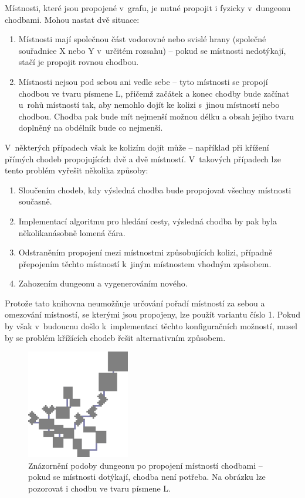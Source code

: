 Místnosti, které jsou propojené v~grafu, je nutné propojit i fyzicky v~dungeonu chodbami.
Mohou nastat dvě situace:
\begin{enumerate}
    \item Místnosti mají společnou část vodorovné nebo svislé hrany (společné souřadnice X nebo Y v~určitém rozsahu) -- pokud se místnosti nedotýkají, stačí je propojit rovnou chodbou.
    \item Místnosti nejsou pod sebou ani vedle sebe -- tyto místnosti se propojí chodbou ve tvaru písmene L, přičemž začátek a konec chodby bude začínat u~rohů místností tak, aby nemohlo dojít ke kolizi s~jinou místností nebo chodbou. Chodba pak bude mít nejmenší možnou délku a obsah jejího tvaru doplněný na obdélník bude co nejmenší.
\end{enumerate}
V~některých případech však ke kolizím dojít může -- například při křížení přímých chodeb propojujících dvě a dvě místností.
V~takových případech lze tento problém vyřešit několika způsoby:
\begin{enumerate}
    \item Sloučením chodeb, kdy výsledná chodba bude propojovat všechny místnosti současně.
    \item Implementací algoritmu pro hledání cesty, výsledná chodba by pak byla několikanásobně lomená čára.
    \item Odstraněním propojení mezi místnostmi způsobujících kolizi, případně přepojením těchto místností k~jiným místnostem vhodným způsobem.
    \item Zahozením dungeonu a vygenerováním nového.
\end{enumerate}
Protože tato knihovna neumožňuje určování pořadí místností za sebou a omezování místností, se kterými jsou propojeny, lze použít variantu číslo 1.
Pokud by však v~budoucnu došlo k~implementaci těchto konfiguračních možností, musel by se problém křížících chodeb řešit alternativním způsobem.
\begin{figure}[hbt]
    \centering
    \includegraphics[width=0.4\textwidth]{obrazky/navrh4.png}
    \caption{Znázornění podoby dungeonu po propojení místností chodbami -- pokud se místnosti dotýkají, chodba není potřeba. Na obrázku lze pozorovat i chodbu ve tvaru písmene L.}
    \label{img:navrh4}
\end{figure}

